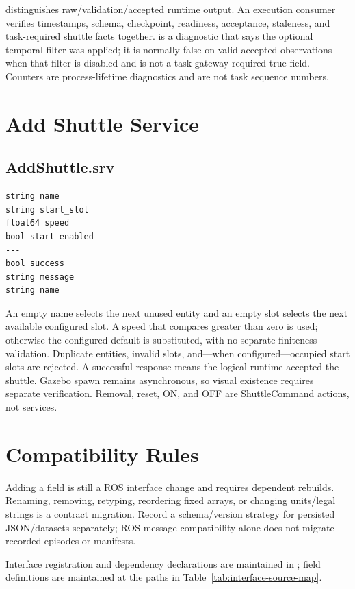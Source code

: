  distinguishes raw/validation/accepted runtime output. An execution
consumer verifies timestamps, schema, checkpoint, readiness, acceptance,
staleness, and task-required shuttle facts together.  is a
diagnostic that says the optional temporal filter was applied; it is normally
false on valid accepted observations when that filter is disabled and is not a
task-gateway required-true field. Counters are process-lifetime diagnostics and
are not task sequence numbers.

\section{Add Shuttle Service}

\subsection{AddShuttle.srv}

\begin{lstlisting}
string name
string start_slot
float64 speed
bool start_enabled
---
bool success
string message
string name
\end{lstlisting}

An empty name selects the next unused entity and an empty slot selects the next
available configured slot. A speed that compares greater than zero is used;
otherwise the configured default is substituted, with no separate finiteness
validation. Duplicate entities, invalid slots, and---when configured---occupied
start slots are rejected. A successful response means the logical runtime
accepted the shuttle. Gazebo spawn remains asynchronous, so visual existence
requires separate verification. Removal, reset, ON, and OFF are ShuttleCommand
actions, not services.

\section{Compatibility Rules}

Adding a field is still a ROS interface change and requires dependent
rebuilds. Renaming, removing, retyping, reordering fixed arrays, or changing
units/legal strings is a contract migration. Record a schema/version strategy
for persisted JSON/datasets separately; ROS message compatibility alone does
not migrate recorded episodes or manifests.

Interface registration and dependency declarations are maintained in
; field definitions are maintained at
the paths in Table~\ref{tab:interface-source-map}.
